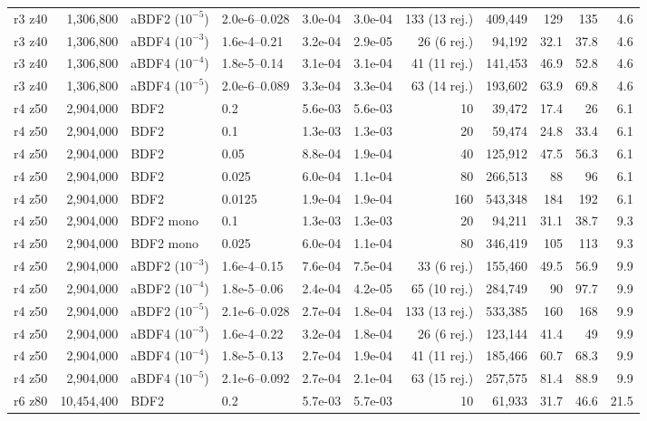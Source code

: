 \begin{longtable}{>{\footnotesize}l>{\footnotesize}r>{\footnotesize}l>{\footnotesize}l>{\footnotesize}r>{\footnotesize}r>{\footnotesize}r>{\footnotesize}r>{\footnotesize}r>{\footnotesize}r>{\footnotesize}r}
r3 z40 & 1,306,800 & aBDF2 ($10^{-5}$) & 2.0e-6--0.028 & 3.0e-04 & 3.0e-04 & 133 (13 rej.) & 409,449 & 129 & 135 & 4.6 \\
r3 z40 & 1,306,800 & aBDF4 ($10^{-3}$) & 1.6e-4--0.21 & 3.2e-04 & 2.9e-05 & 26 (6 rej.) & 94,192 & 32.1 & 37.8 & 4.6 \\
r3 z40 & 1,306,800 & aBDF4 ($10^{-4}$) & 1.8e-5--0.14 & 3.1e-04 & 3.1e-04 & 41 (11 rej.) & 141,453 & 46.9 & 52.8 & 4.6 \\
r3 z40 & 1,306,800 & aBDF4 ($10^{-5}$) & 2.0e-6--0.089 & 3.3e-04 & 3.3e-04 & 63 (14 rej.) & 193,602 & 63.9 & 69.8 & 4.6 \\
r4 z50 & 2,904,000 & BDF2 & 0.2 & 5.6e-03 & 5.6e-03 & 10 & 39,472 & 17.4 & 26 & 6.1 \\
r4 z50 & 2,904,000 & BDF2 & 0.1 & 1.3e-03 & 1.3e-03 & 20 & 59,474 & 24.8 & 33.4 & 6.1 \\
r4 z50 & 2,904,000 & BDF2 & 0.05 & 8.8e-04 & 1.9e-04 & 40 & 125,912 & 47.5 & 56.3 & 6.1 \\
r4 z50 & 2,904,000 & BDF2 & 0.025 & 6.0e-04 & 1.1e-04 & 80 & 266,513 & 88 & 96 & 6.1 \\
r4 z50 & 2,904,000 & BDF2 & 0.0125 & 1.9e-04 & 1.9e-04 & 160 & 543,348 & 184 & 192 & 6.1 \\
r4 z50 & 2,904,000 & BDF2 mono & 0.1 & 1.3e-03 & 1.3e-03 & 20 & 94,211 & 31.1 & 38.7 & 9.3 \\
r4 z50 & 2,904,000 & BDF2 mono & 0.025 & 6.0e-04 & 1.1e-04 & 80 & 346,419 & 105 & 113 & 9.3 \\
r4 z50 & 2,904,000 & aBDF2 ($10^{-3}$) & 1.6e-4--0.15 & 7.6e-04 & 7.5e-04 & 33 (6 rej.) & 155,460 & 49.5 & 56.9 & 9.9 \\
r4 z50 & 2,904,000 & aBDF2 ($10^{-4}$) & 1.8e-5--0.06 & 2.4e-04 & 4.2e-05 & 65 (10 rej.) & 284,749 & 90 & 97.7 & 9.9 \\
r4 z50 & 2,904,000 & aBDF2 ($10^{-5}$) & 2.1e-6--0.028 & 2.7e-04 & 1.8e-04 & 133 (13 rej.) & 533,385 & 160 & 168 & 9.9 \\
r4 z50 & 2,904,000 & aBDF4 ($10^{-3}$) & 1.6e-4--0.22 & 3.2e-04 & 1.8e-04 & 26 (6 rej.) & 123,144 & 41.4 & 49 & 9.9 \\
r4 z50 & 2,904,000 & aBDF4 ($10^{-4}$) & 1.8e-5--0.13 & 2.7e-04 & 1.9e-04 & 41 (11 rej.) & 185,466 & 60.7 & 68.3 & 9.9 \\
r4 z50 & 2,904,000 & aBDF4 ($10^{-5}$) & 2.1e-6--0.092 & 2.7e-04 & 2.1e-04 & 63 (15 rej.) & 257,575 & 81.4 & 88.9 & 9.9 \\
r6 z80 & 10,454,400 & BDF2 & 0.2 & 5.7e-03 & 5.7e-03 & 10 & 61,933 & 31.7 & 46.6 & 21.5 \\

\end{longtable}
